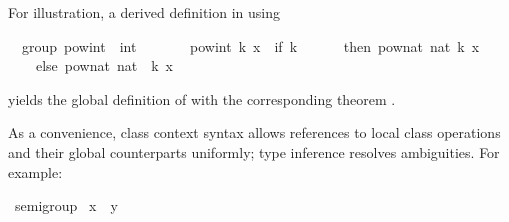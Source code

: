 \begin{isabellebody}
\begin{isamarkuptext}
  For illustration, a derived definition in  using %
\end{isamarkuptext}%
\isamarkuptrue%
%
\isadelimquote
%
\endisadelimquote
%
\isatagquote
{}\isamarkupfalse%
\ {\isacharparenleft}\ group{\isacharparenright}\ pow{\isacharunderscore}int\ {\isacharcolon}{\isacharcolon}\ {\isachardoublequoteopen}int\ {\isasymRightarrow}\ {\isasymalpha}\ {\isasymRightarrow}\ {\isasymalpha}{\isachardoublequoteclose}\ \isanewline
\ \ {\isachardoublequoteopen}pow{\isacharunderscore}int\ k\ x\ {\isacharequal}\ {\isacharparenleft}if\ k\ {\isachargreater}{\isacharequal}\ {}\isanewline
\ \ \ \ then\ pow{\isacharunderscore}nat\ {\isacharparenleft}nat\ k{\isacharparenright}\ x\isanewline
\ \ \ \ else\ {\isacharparenleft}pow{\isacharunderscore}nat\ {\isacharparenleft}nat\ {\isacharparenleft}{\isacharminus}\ k{\isacharparenright}{\isacharparenright}\ x{\isacharparenright}{\isasymdiv}{\isacharparenright}{\isachardoublequoteclose}%
\endisatagquote
{\isafoldquote}%
%
\isadelimquote
%
\endisadelimquote
%
\begin{isamarkuptext}%
\noindent yields the global definition of  with the corresponding theorem .%
\end{isamarkuptext}%
\isamarkuptrue%
%
\isamarkuptrue%
%
\begin{isamarkuptext}%
As a convenience, class context syntax allows references to local
  class operations and their global counterparts uniformly; type
  inference resolves ambiguities.  For example:%
\end{isamarkuptext}%
\isamarkuptrue%
%
\isadelimquote
%
\endisadelimquote
%
\isatagquote
{}\isamarkupfalse%
\ semigroup\isanewline
{}\isanewline
\isanewline
{}\isamarkupfalse%
\ {\isachardoublequoteopen}x\ {\isasymotimes}\ y{\isachardoublequoteclose}\ %

\end{isabellebody}
